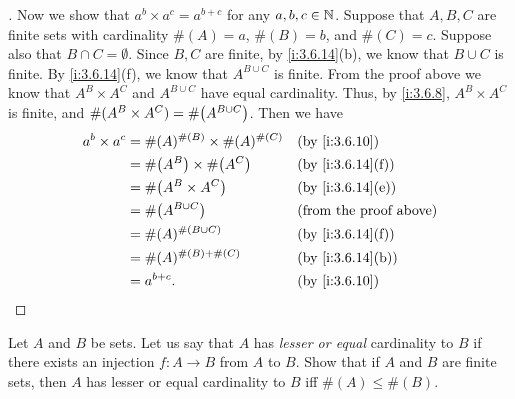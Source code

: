 \begin{proof}[]
  Now we show that \(a^b \times a^c = a^{b + c}\) for any \(a, b, c \in \mathbb{N}\).
  Suppose that \(A, B, C\) are finite sets with cardinality \(\#(A) = a\), \(\#(B) = b\), and \(\#(C) = c\).
  Suppose also that \(B \cap C = \emptyset\).
  Since \(B, C\) are finite, by \cref{i:3.6.14}(b), we know that \(B \cup C\) is finite.
  By \cref{i:3.6.14}(f), we know that \(A^{B \cup C}\) is finite.
  From the proof above we know that \(A^B \times A^C\) and \(A^{B \cup C}\) have equal cardinality.
  Thus, by \cref{i:3.6.8}, \(A^B \times A^C\) is finite, and \(\#(A^B \times A^C) = \#\pa{A^{B \cup C}}\).
  Then we have
  \begin{align*}
    a^b \times a^c & = \#(A)^{\#(B)} \times \#(A)^{\#(C)} &  & \by{i:3.6.10}                 \\
                   & = \#\pa{A^B} \times \#\pa{A^C}       &  & \by{i:3.6.14}[f]              \\
                   & = \#\pa{A^B \times A^C}              &  & \by{i:3.6.14}[e]              \\
                   & = \#\pa{A^{B \cup C}}                &  & \text{(from the proof above)} \\
                   & = \#(A)^{\#(B \cup C)}               &  & \by{i:3.6.14}[f]              \\
                   & = \#(A)^{\#(B) + \#(C)}              &  & \by{i:3.6.14}[b]              \\
                   & = a^{b + c}.                         &  & \by{i:3.6.10}
  \end{align*}
\end{proof}

\begin{ex}\label{i:ex:3.6.7}
  Let \(A\) and \(B\) be sets.
  Let us say that \(A\) has \emph{lesser or equal} cardinality to \(B\) if there exists an injection \(f : A \to B\) from \(A\) to \(B\).
  Show that if \(A\) and \(B\) are finite sets, then \(A\) has lesser or equal cardinality to \(B\) iff \(\#(A) \leq \#(B)\).
\end{ex}

